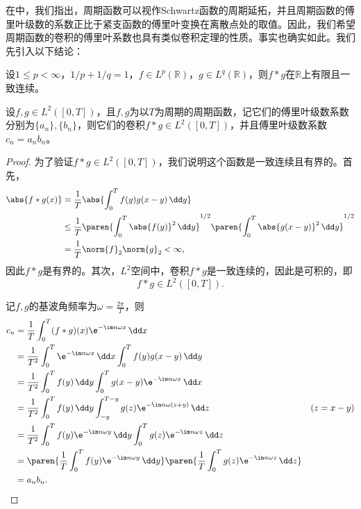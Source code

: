 在中，我们指出，周期函数可以视作Schwartz函数的周期延拓，并且周期函数的傅里叶级数的系数正比于紧支函数的傅里叶变换在离散点处的取值。因此，我们希望周期函数的卷积的傅里叶系数也具有类似卷积定理的性质。事实也确实如此。我们先引入以下结论：
\begin{claim}
    设$1\le p<\infty$，$1/p+1/q=1$，$f\in L^p(\mathbb{R})$，$g\in L^q(\mathbb{R})$，则$f*g$在$\mathbb{R}$上有限且一致连续。
\end{claim}
\begin{theorem}[周期函数的卷积定理]
    设$f,g\in L^2([0,T])$，且$f,g$为以$T$为周期的周期函数，记它们的傅里叶级数系数分别为$\{a_n\},\{b_n\}$，则它们的卷积$f*g\in L^2([0,T])$，并且傅里叶级数系数$c_n=a_n b_n$。
\end{theorem}
\begin{proof}
    为了验证$f*g\in L^2([0,T])$，我们说明这个函数是一致连续且有界的。首先，
    \begin{align}
        \abs{f*g(x)}&=\frac{1}{T}\abs{\int_0^{T}f(y)g(x-y)\,\dd y}\nonumber\\
        &\leq \frac{1}{T}\paren{\int_0^{T}\abs{f(y)}^2\,\dd y}^{1/2}\paren{\int_0^{T}\abs{g(x-y)}^2\,\dd y}^{1/2}\nonumber\\
        &=\frac{1}{T}\norm{f}_2\norm{g}_2<\infty,
    \end{align}
    因此$f*g$是有界的。其次，$L^2$空间中，卷积$f*g$是一致连续的，因此是可积的，即
    \begin{equation}
        f*g\in L^2([0,T]).
    \end{equation}

    记$f,g$的基波角频率为$\displaystyle\omega=\frac{2\pi}{T}$，则
    \begin{align}
        c_n&=\frac{1}{T}\int_0^{T}(f*g)(x)\e^{-\im n\omega x}\,\dd x\nonumber\\
        &=\frac{1}{T^2}\int_0^{T}\e^{-\im n\omega x}\,\dd x\int_0^{T}f(y)g(x-y)\,\dd y\nonumber\\
        &=\frac{1}{T^2}\int_0^{T}f(y)\,\dd y\int_0^{T}g(x-y)\e^{-\im n\omega x}\,\dd x\nonumber\\
        &=\frac{1}{T^2}\int_0^{T}f(y)\,\dd y\int_{-y}^{T-y}g(z)\e^{-\im n\omega(z+y)}\,\dd z&(z=x-y)\nonumber\\
        &=\frac{1}{T^2}\int_0^{T}f(y)\e^{-\im n\omega y}\,\dd y\int_0^{T}g(z)\e^{-\im n\omega z}\,\dd z\nonumber\\
        &=\paren{\frac{1}{T}\int_0^{T}f(y)\e^{-\im n\omega y}\,\dd y}\paren{\frac{1}{T}\int_0^{T}g(z)\e^{-\im n\omega z}\,\dd z}\nonumber\\
        &=a_n b_n.
    \end{align}
\end{proof}

